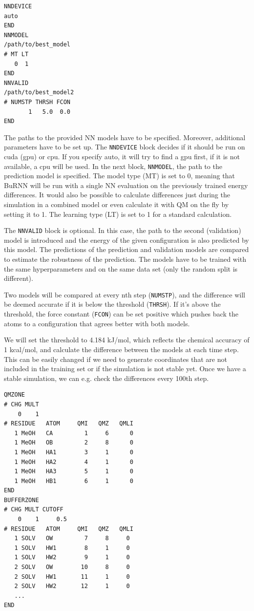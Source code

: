 \begin{lstlisting}[breaklines=true, breakatwhitespace=false]
NNDEVICE
auto
END
NNMODEL
/path/to/best_model
# MT LT
   0  1
END
NNVALID
/path/to/best_model2
# NUMSTP THRSH FCON 
       1   5.0  0.0
END
\end{lstlisting}

The paths to the provided NN models have to be specified. Moreover, additional parameters have to be set up. The \texttt{NNDEVICE} block decides if it should be run on cuda (gpu) or cpu. If you specify auto, it will try to find a gpu first, if it is not available, a cpu will be used. 
In the next block, \texttt{NNMODEL}, the path to the prediction model is specified. The model type (MT) is set to 0, meaning that BuRNN will be run with a single NN evaluation on the previously trained energy differences. It would also be possible to calculate differences just during the simulation in a combined model or even calculate it with QM on the fly by setting it to 1. The learning type (LT) is set to 1 for a standard calculation. 

The \texttt{NNVALID} block is optional. In this case, the path to the second (validation) model is introduced and the energy of the given configuration is also predicted by this model. The predictions of the prediction and validation models are compared to estimate the robustness of the prediction. The models have to be trained with the same hyperparameters and on the same data set (only the random split is different). 

Two models will be compared at every nth step (\texttt{NUMSTP}), and the difference will be deemed accurate if it is below the threshold (\texttt{THRSH}). If it’s above the threshold, the force constant (\texttt{FCON}) can be set positive which pushes back the atoms to a configuration that agrees better with both models. 

We will set the threshold to 4.184 kJ/mol, which reflects the chemical accuracy of 1 kcal/mol, and calculate the difference between the models at each time step. This can be easily changed if we need to generate coordinates that are not included in the training set or if the simulation is not stable yet. Once we have a stable simulation, we can e.g. check the differences every 100th step.

\begin{lstlisting}[breaklines=true, breakatwhitespace=false]
QMZONE
# CHG MULT
    0    1
# RESIDUE   ATOM     QMI   QMZ   QMLI
   1 MeOH   CA         1     6      0
   1 MeOH   OB         2     8      0
   1 MeOH   HA1        3     1      0
   1 MeOH   HA2        4     1      0
   1 MeOH   HA3        5     1      0
   1 MeOH   HB1        6     1      0
END
BUFFERZONE
# CHG MULT CUTOFF 
    0    1     0.5
# RESIDUE   ATOM     QMI   QMZ   QMLI
   1 SOLV   OW         7     8     0
   1 SOLV   HW1        8     1     0
   1 SOLV   HW2        9     1     0
   2 SOLV   OW        10     8     0
   2 SOLV   HW1       11     1     0
   2 SOLV   HW2       12     1     0
   ...
END
\end{lstlisting}

